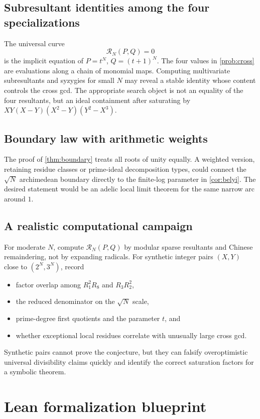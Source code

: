 \documentclass[11pt]{article}
\theoremstyle{definition}
\theoremstyle{remark}
\begin{document}
\subsection{Subresultant identities among the four specializations}
The universal curve
\[
\mathscr R_N(P,Q)=0
\]
is the implicit equation of \(P=t^N\), \(Q=(t+1)^N\).  The four values in \cref{prob:cross} are evaluations along a chain of monomial maps.  Computing multivariate subresultants and syzygies for small \(N\) may reveal a stable identity whose content controls the cross gcd.  The appropriate search object is not an equality of the four resultants, but an ideal containment after saturating by \(XY(X-Y)(X^2-Y)(Y^2-X^3)\).

\subsection{Boundary law with arithmetic weights}
The proof of \cref{thm:boundary} treats all roots of unity equally.  A weighted version, retaining residue classes or prime-ideal decomposition types, could connect the \(\sqrt N\) archimedean boundary directly to the finite-log parameter in \cref{cor:belyi}.  The desired statement would be an adelic local limit theorem for the same narrow arc around \(1\).

\subsection{A realistic computational campaign}
For moderate \(N\), compute \(\mathscr R_N(P,Q)\) by modular sparse resultants and Chinese remaindering, not by expanding radicals.  For synthetic integer pairs \((X,Y)\) close to \((2^N,3^N)\), record
\begin{itemize}
\item factor overlap among \(R_1^2R_8\) and \(R_3R_2^2\),
\item the reduced denominator on the \(\sqrt N\) scale,
\item prime-degree first quotients and the parameter \(t\), and
\item whether exceptional local residues correlate with unusually large cross gcd.
\end{itemize}
Synthetic pairs cannot prove the conjecture, but they can falsify overoptimistic universal divisibility claims quickly and identify the correct saturation factors for a symbolic theorem.

\section{Lean formalization blueprint}\label{sec:lean}
\end{document}
